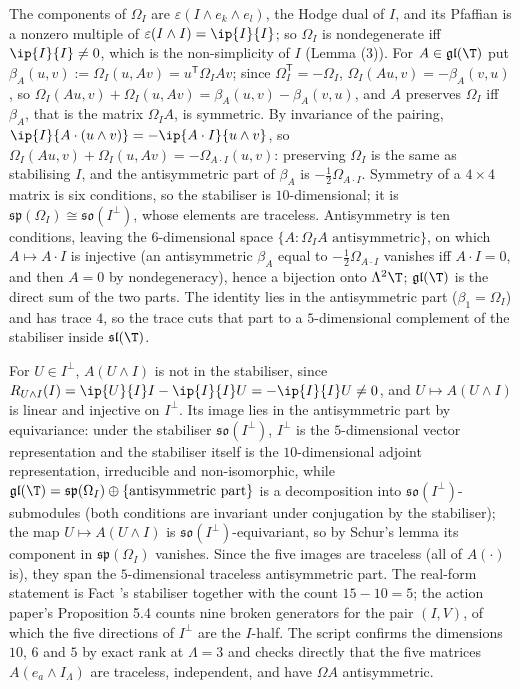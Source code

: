 The components of $\Omega_{I}$ are $\varepsilon(I\wedge e_{k}\wedge e_{l})$, the Hodge dual of $I$, and its Pfaffian is a nonzero multiple of $\varepsilon(I\wedge I) = \ip{I}{I}$; so $\Omega_{I}$ is nondegenerate iff $\ip{I}{I} \neq 0$, which is the non-simplicity of $I$ (Lemma (3)). For $A \in \mathfrak{gl}(\T)$ put $\beta_{A}(u,v) := \Omega_{I}(u, Av) = u^{\mathsf T}\Omega_{I}Av$; since $\Omega_{I}^{\mathsf T} = -\Omega_{I}$, $\Omega_{I}(Au,v) = -\beta_{A}(v,u)$, so $\Omega_{I}(Au,v) + \Omega_{I}(u,Av) = \beta_{A}(u,v) - \beta_{A}(v,u)$, and $A$ preserves $\Omega_{I}$ iff $\beta_{A}$, that is the matrix $\Omega_{I}A$, is symmetric. By invariance of the pairing, $\ip{I}{A\cdot(u\wedge v)} = -\ip{A\cdot I}{u\wedge v}$, so $\Omega_{I}(Au,v) + \Omega_{I}(u,Av) = -\Omega_{A\cdot I}(u,v)$: preserving $\Omega_{I}$ is the same as stabilising $I$, and the antisymmetric part of $\beta_{A}$ is $-\tfrac12\Omega_{A\cdot I}$. Symmetry of a $4\times 4$ matrix is six conditions, so the stabiliser is $10$-dimensional; it is $\mathfrak{sp}(\Omega_{I}) \cong \mathfrak{so}(I^{\perp})$, whose elements are traceless. Antisymmetry is ten conditions, leaving the $6$-dimensional space $\{A : \Omega_{I}A \text{ antisymmetric}\}$, on which $A \mapsto A\cdot I$ is injective (an antisymmetric $\beta_{A}$ equal to $-\tfrac12\Omega_{A\cdot I}$ vanishes iff $A\cdot I = 0$, and then $A = 0$ by nondegeneracy), hence a bijection onto $\Lambda^{2}\T$; $\mathfrak{gl}(\T)$ is the direct sum of the two parts. The identity lies in the antisymmetric part ($\beta_{1} = \Omega_{I}$) and has trace $4$, so the trace cuts that part to a $5$-dimensional complement of the stabiliser inside $\mathfrak{sl}(\T)$.

For $U \in I^{\perp}$, $A(U\wedge I)$ is not in the stabiliser, since $R_{U\wedge I}(I) = \ip{U}{I}I - \ip{I}{I}U = -\ip{I}{I}U \neq 0$, and $U \mapsto A(U\wedge I)$ is linear and injective on $I^{\perp}$. Its image lies in the antisymmetric part by equivariance: under the stabiliser $\mathfrak{so}(I^{\perp})$, $I^{\perp}$ is the $5$-dimensional vector representation and the stabiliser itself is the $10$-dimensional adjoint representation, irreducible and non-isomorphic, while $\mathfrak{gl}(\T) = \mathfrak{sp}(\Omega_{I}) \oplus \{\text{antisymmetric part}\}$ is a decomposition into $\mathfrak{so}(I^{\perp})$-submodules (both conditions are invariant under conjugation by the stabiliser); the map $U \mapsto A(U\wedge I)$ is $\mathfrak{so}(I^{\perp})$-equivariant, so by Schur's lemma its component in $\mathfrak{sp}(\Omega_{I})$ vanishes. Since the five images are traceless (all of $A(\cdot)$ is), they span the $5$-dimensional traceless antisymmetric part. The real-form statement is Fact 's stabiliser together with the count $15 - 10 = 5$; the action paper's Proposition 5.4 counts nine broken generators for the pair $(I, V)$, of which the five directions of $I^{\perp}$ are the $I$-half. The script confirms the dimensions $10$, $6$ and $5$ by exact rank at $\Lambda = 3$ and checks directly that the five matrices $A(e_{a}\wedge I_{\Lambda})$ are traceless, independent, and have $\Omega A$ antisymmetric.
